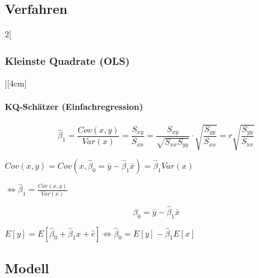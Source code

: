 \documentclass[8pt]{extarticle}
\begin{document}
\subsection{Verfahren}
\begin{multicols}{2}[\subsubsection{Kleinste Quadrate (OLS)}][4cm]

\paragraph{KQ-Schätzer (Einfachregression)}

$$\hat{\beta}_1=\frac{Cov(x,y)}{Var(x)}=\frac{S_{xy}}{S_{xx}}= \frac{S_{xy}}{\sqrt{S_{xx}S_{yy}}} \cdot \sqrt{\frac{S_{yy}}{S_{xx}}}=r\sqrt{\frac{S_{yy}}{S_{xx}}}$$

\begin{Beweis}
$Cov(x,y)=Cov(x,\hat{\beta}_0=\bar{y}-\hat{\beta}_1\bar{x})=\hat{\beta}_1Var(x)$

\raggedleft
$ \iff \hat{\beta}_1= \frac{Cov(x,y)}{Var(x)}$
\end{Beweis}

$$\hat{\beta}_0=\bar{y}-\hat{\beta}_1\bar{x}$$

\begin{Beweis}
$E\left[y\right] = E\left[\hat{\beta}_0+\hat{\beta}_1 x+\hat{e}\right] \iff \hat{\beta}_0 = E\left[y\right] - \hat{\beta}_1E\left[x\right]$
\end{Beweis}

\end{multicols}

\subsection{Modell}
\end{document}

